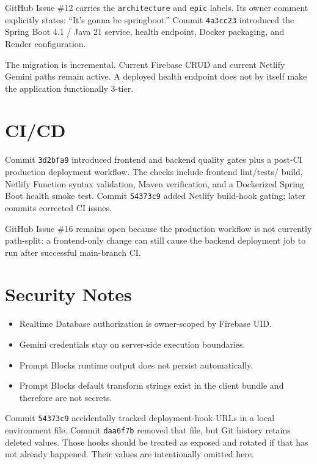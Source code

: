 \documentclass[11pt]{article}
\newcommand{\code}[1]{\texttt{#1}}
\newcommand{\commit}[1]{\texttt{#1}}
\begin{document}
GitHub Issue \#12 carries the \code{architecture} and \code{epic} labels. Its
owner comment explicitly states: ``It's gonna be springboot.'' Commit
\commit{4a3cc23} introduced the Spring Boot 4.1 / Java 21 service, health endpoint,
Docker packaging, and Render configuration.

The migration is incremental. Current Firebase CRUD and current Netlify Gemini
paths remain active. A deployed health endpoint does not by itself make the
application functionally 3-tier.

\section{CI/CD}

Commit \commit{3d2bfa9} introduced frontend and backend quality gates plus a
post-CI production deployment workflow. The checks include frontend lint/tests/
build, Netlify Function syntax validation, Maven verification, and a Dockerized
Spring Boot health smoke test. Commit \commit{54373c9} added Netlify build-hook
gating; later commits corrected CI issues.

GitHub Issue \#16 remains open because the production workflow is not currently
path-split: a frontend-only change can still cause the backend deployment job to
run after successful main-branch CI.

\section{Security Notes}

\begin{itemize}
  \item Realtime Database authorization is owner-scoped by Firebase UID.
  \item Gemini credentials stay on server-side execution boundaries.
  \item Prompt Blocks runtime output does not persist automatically.
  \item Prompt Blocks default transform strings exist in the client bundle and
        therefore are not secrets.
\end{itemize}

Commit \commit{54373c9} accidentally tracked deployment-hook URLs in a local
environment file. Commit \commit{daa6f7b} removed that file, but Git history
retains deleted values. Those hooks should be treated as exposed and rotated if
that has not already happened. Their values are intentionally omitted here.
\end{document}
